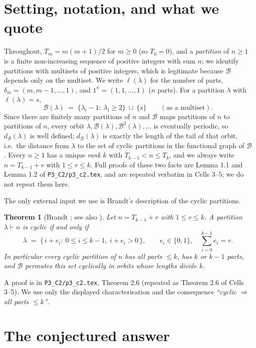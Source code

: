 \documentclass[11pt]{article}
\newtheorem{theorem}{Theorem}[section]
\theoremstyle{definition}
\newcommand{\B}{\mathcal{B}}
\newcommand{\dB}{d_{\mathcal{B}}}
\renewcommand{\le}{\leqslant}
\renewcommand{\ge}{\geqslant}
\begin{document}
\section{Setting, notation, and what we quote}\label{sec:defs}

Throughout, $T_m=m(m+1)/2$ for $m\ge0$ (so $T_0=0$), and a \emph{partition} of $n\ge1$ is a finite non-increasing
sequence of positive integers with sum $n$; we identify partitions with multisets of positive integers, which is
legitimate because $\B$ depends only on the multiset.  We write $\ell(\lambda)$ for the number of parts,
$\delta_m=(m,m-1,\dots,1)$, and $1^n=(1,1,\dots,1)$ ($n$ parts).  For a partition $\lambda$ with
$\ell(\lambda)=s$,
\[
\B(\lambda)\;=\;\{\lambda_i-1:\ \lambda_i\ge2\}\ \cup\ \{s\}\qquad(\text{as a multiset}).
\]
Since there are finitely many partitions of $n$ and $\B$ maps partitions of $n$ to partitions of $n$, every orbit
$\lambda,\B(\lambda),\B^2(\lambda),\dots$ is eventually periodic, so $\dB(\lambda)$ is well defined; $\dB(\lambda)$
is exactly the length of the tail of that orbit, i.e.\ the distance from $\lambda$ to the set of cyclic partitions
in the functional graph of $\B$.  Every $n\ge1$ has a unique \emph{rank} $k$ with $T_{k-1}<n\le T_k$, and we always
write $n=T_{k-1}+r$ with $1\le r\le k$.  Full proofs of these two facts are Lemma 1.1 and Lemma 1.2 of
\texttt{P3\_C2/p3\_c2.tex}, and are repeated verbatim in Cells 3--5; we do not repeat them here.

The only external input we use is Brandt's description of the cyclic partitions.

\begin{theorem}[Brandt \cite{Brandt82}; see also {\cite[\S2]{GH98}}]\label{thm:brandt}
Let $n=T_{k-1}+r$ with $1\le r\le k$.  A partition $\lambda\vdash n$ is cyclic if and only if
\[
\lambda\;=\;\{\,i+e_i:\ 0\le i\le k-1,\ i+e_i>0\,\},\qquad e_i\in\{0,1\},\quad \textstyle\sum_{i=0}^{k-1}e_i=r .
\]
In particular every cyclic partition of $n$ has all parts $\le k$, has $k$ or $k-1$ parts, and $\B$ permutes this
set cyclically in orbits whose lengths divide $k$.
\end{theorem}

A proof is in \texttt{P3\_C2/p3\_c2.tex}, Theorem 2.6 (repeated as Theorem 2.6 of Cells 3--5).  We use only the
displayed characterisation and the consequence \emph{``cyclic $\Rightarrow$ all parts $\le k$''}.

\section{The conjectured answer}\label{sec:conj}
\end{document}
